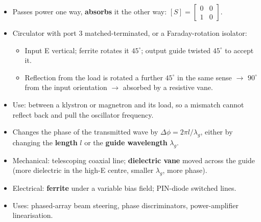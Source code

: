 {
\begin{itemize}
  \item Passes power one way, \textbf{absorbs} it the other way:
    $[S] = \left[\begin{smallmatrix}0&0\\1&0\end{smallmatrix}\right]$.
  \item Circulator with port 3 matched-terminated, or a Faraday-rotation isolator:
  \begin{itemize}
    \item Input E vertical; ferrite rotates it $45^\circ$; output guide twisted
      $45^\circ$ to accept it.
    \item Reflection from the load is rotated a further $45^\circ$ in the same sense
      $\rightarrow$ $90^\circ$ from the input orientation $\rightarrow$ absorbed by a
      resistive vane.
  \end{itemize}
  \item Use: between a klystron or magnetron and its load, so a mismatch cannot reflect
    back and pull the oscillator frequency.
\end{itemize}
}

\par{}
\begin{itemize}
  \item Changes the phase of the transmitted wave by $\Delta\phi = 2\pi l/\lambda_g$,
    either by changing the \textbf{length} $l$ or the \textbf{guide wavelength} $\lambda_g$.
  \item Mechanical: telescoping coaxial line; \textbf{dielectric vane} moved across the
    guide (more dielectric in the high-E centre, smaller $\lambda_g$, more phase).
  \item Electrical: \textbf{ferrite} under a variable bias field; PIN-diode switched lines.
  \item Uses: phased-array beam steering, phase discriminators, power-amplifier
    linearisation.
\end{itemize}

\vspace{2pt}


{\color{sub}\footnotesize {} }

